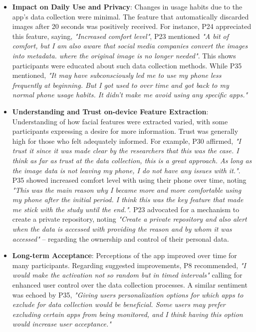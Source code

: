 \begin{itemize}
    \item \textbf{Impact on Daily Use and Privacy}: Changes in usage habits due to the app’s data collection were minimal. The feature that automatically discarded images after 20 seconds was positively received. For instance, P24 appreciated this feature, saying, \textit{"Increased comfort level"}, P23 mentioned \textit{"A bit of comfort, but I am also aware that social media companies convert the images into metadata. where the original image is no longer needed"}. This shows participants were educated about such data collection methods. While P35 mentioned, \textit{"It may have subconsciously led me to use my phone less frequently at beginning. But I got used to over time and got back to my normal phone usage habits. It didn't make me avoid using any specific apps."}

    \item \textbf{Understanding and Trust on-device Feature Extraction}: Understanding of how facial features were extracted varied, with some participants expressing a desire for more information. Trust was generally high for those who felt adequately informed. For example, P30 affirmed, \textit{"I trust it since it was made clear by the researchers that this was the case. I think as far as trust at the data collection, this is a great approach. As long as the image data is not leaving my phone, I do not have any issues with it."}. P35 showed increased comfort level with using their phone over time, noting \textit{"This was the main reason why I became more and more comfortable using my phone after the initial period. I think this was the key feature that made me stick with the study until the end."}. P23 advocated for a mechanism to create a private repository, noting \textit{"Create a private repository and also alert when the data is accessed with providing the reason and by whom it was accessed"} -- regarding the ownership and control of their personal data.

    \item \textbf{Long-term Acceptance}: Perceptions of the app improved over time for many participants. Regarding suggested improvements, P8 recommended, \textit{"I would make the activation not so random but in timed intervals"} calling for enhanced user control over the data collection processes. A similar sentiment was echoed by P35, \textit{"Giving users personalization options for which apps to exclude for data collection would be beneficial. Some users may prefer excluding certain apps from being monitored, and I think having this option would increase user acceptance."}
\end{itemize}

